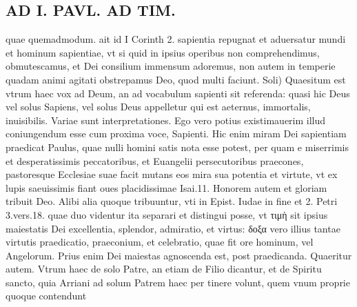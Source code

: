 \documentclass{article}
\begin{document}
\begin{pages}
\section*{AD I. PAVL. AD TIM. }
\marginpar{[ p.32 ]}\pstart quae quemadmodum. ait id I Corinth 2. sapientia repugnat et aduersatur mundi et hominum sapientiae, vt si quid in ipsius operibus non comprehendimus, obmutescamus, et Dei consilium immensum adoremus, non autem in temperie quadam animi agitati obstrepamus Deo, quod multi faciunt.  \pend\pstart Soli) Quaesitum est vtrum haec vox ad Deum, an ad vocabulum sapienti sit referenda: quasi hic Deus vel solus Sapiens, vel solus Deus appelletur qui est aeternus, immortalis, inuisibilis. Variae sunt interpretationes. Ego vero potius existimauerim illud coniungendum esse cum proxima voce, Sapienti. Hic enim miram Dei sapientiam praedicat Paulus, quae nulli homini satis nota esse potest, per quam e miserrimis et desperatissimis peccatoribus, et Euangelii persecutoribus praecones, pastoresque Ecclesiae suae facit mutans eos mira sua potentia et virtute, vt ex lupis saeuissimis fiant oues placidissimae Isai.11.  \pend\pstart Honorem autem et gloriam tribuit Deo. Alibi alia quoque tribuuntur, vti in Epist. Iudae in fine et 2. Petri 3.vers.18. quae duo videntur ita separari et distingui posse, vt τιμὴ sit ipsius maiestatis Dei excellentia, splendor, admiratio, et virtus: δοξα vero illius tantae virtutis praedicatio, praeconium, et celebratio, quae fit ore hominum, vel Angelorum. Prius enim Dei maiestas agnoscenda est, post praedicanda.  \pend\pstart Quaeritur autem. Vtrum haec de solo Patre, an etiam de Filio dicantur, et de Spiritu sancto, quia Arriani ad solum Patrem haec per tinere volunt, quem vnum proprie quoque contendunt  \pend

\end{pages}
\end{document}
